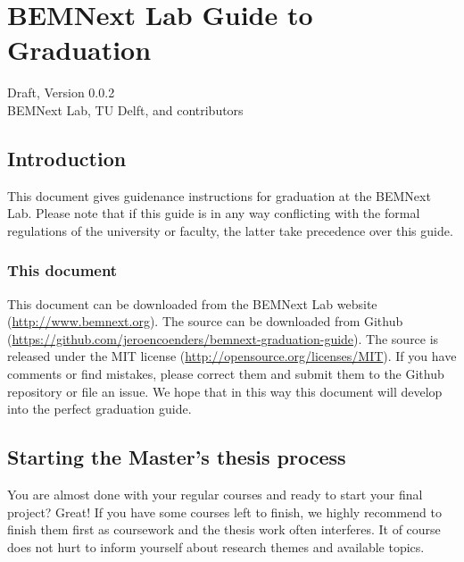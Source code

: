 \documentclass{latex-format/stylesheets/BEMNextstyle}
\begin{document}
\pagestyle{trail}
\mainmatter
\cleardoublepage
{}
{}
\chapter*{BEMNext Lab Guide to Graduation}
Draft, Version 0.0.2\\
BEMNext Lab, TU Delft, and contributors

\section*{Introduction}
This document gives guidenance instructions for graduation at the BEMNext Lab.  Please note that if this guide is in any way conflicting with the formal regulations of the university or faculty, the latter take precedence over this guide.

\subsection*{This document}
This document can be downloaded from the BEMNext Lab website (\url{http://www.bemnext.org}). The source can be downloaded from Github (\url{https://github.com/jeroencoenders/bemnext-graduation-guide}). The source is released under the MIT license (\url{http://opensource.org/licenses/MIT}). If you have comments or find mistakes, please correct them and submit them to the Github repository or file an issue. We hope that in this way this document will develop into the perfect graduation guide.

\section*{Starting the Master's thesis process}
You are almost done with your regular courses and ready to start your final project? Great! If you have some courses left to finish, we highly recommend to finish them first as coursework and the thesis work often interferes. It of course does not hurt to inform yourself about research themes and available topics.
\end{document}
